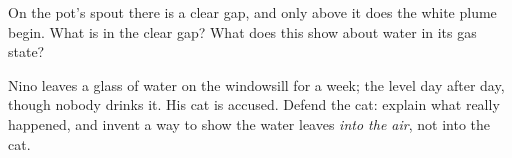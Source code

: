 \begin{exercise}[$\star\star$]\label{exo:g2:ice-water-steam:9}
On the pot's spout there is a clear gap, and only above it does the
white plume begin. What is in the clear gap? What does this show
about water in its gas state?
\end{exercise}

\begin{exercise}[$\star\star$]\label{exo:g2:ice-water-steam:10}
Nino leaves a glass of water on the windowsill for a week; the level
 day after day, though nobody drinks it. His cat is accused.
Defend the cat: explain what really happened, and invent a way to
show the water leaves \emph{into the air}, not into the cat.
\end{exercise}
